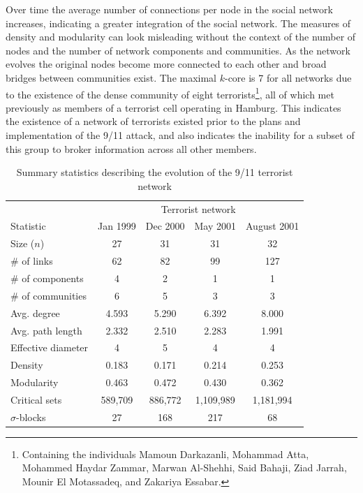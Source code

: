 Over time the average number of connections per node in the social network increases, indicating a greater integration of the social network. The measures of density and modularity can look misleading without the context of the number of nodes and the number of network components and communities. As the network evolves the original nodes become more connected to each other and broad bridges between communities exist. The maximal $k$-core is 7 for all networks due to the existence of the dense community of eight terrorists\footnote{Containing the individuals Mamoun Darkazanli, Mohammad Atta, Mohammed Haydar Zammar, Marwan Al-Shehhi, Said Bahaji, Ziad Jarrah, Mounir El Motassadeq, and Zakariya Essabar.}, all of which met previously as members of a terrorist cell operating in Hamburg. This indicates the existence of a network of terrorists existed prior to the plans and implementation of the 9/11 attack, and also indicates the inability for a subset of this group to broker information across all other members.

\begin{table}[h]
\begin{center}
\begin{tabular}{lcccc}
\toprule
& \multicolumn{4}{c}{Terrorist network} \\[1ex]
Statistic			& Jan 1999 	& Dec 2000 	& May 2001 	& August 2001 	\\
\midrule
Size ($n$)  		& 27		& 31		& 31 		& 32			\\
\# of links 		& 62 		& 82 		& 99 		& 127 			\\
\# of components  	& 4 		& 2 		& 1 		& 1 			\\
\# of communities 	& 6 		& 5 		& 3 		& 3 			\\
Avg. degree  	  	& 4.593  	& 5.290 	& 6.392 	& 8.000 		\\
Avg. path length 	& 2.332	 	& 2.510 	& 2.283 	& 1.991 		\\
Effective diameter 	& 4 		& 5 		& 4 		& 4 			\\
Density 			& 0.183 	& 0.171 	& 0.214 	& 0.253 		\\
Modularity  		& 0.463  	& 0.472 	& 0.430 	& 0.362 		\\
Critical sets  		& 589,709 	& 886,772 	& 1,109,989 & 1,181,994		\\
$\sigma$-blocks 	& 27 		& 168 		& 217 		& 68			\\
\bottomrule
\end{tabular}
\end{center}
\caption{Summary statistics describing the evolution of the 9/11 terrorist network}
\label{TerroristSS}
\end{table}

